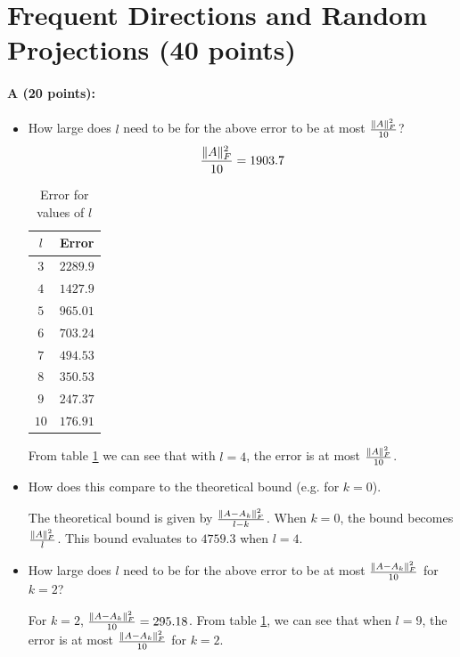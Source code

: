 \documentclass[11pt]{article}
\begin{document}
\section{Frequent Directions and Random Projections (40 points)}

\paragraph{A (20 points):}

\begin{itemize}
\item How large does $l$ need to be for the above error to be at most $\frac{\lVert A\rVert_F^2}{10}$?\\
$$
\frac{\lVert A\rVert_F^2}{10} = 1903.7
$$

\begin{table}[!h] 
    \centering
    \caption{Error for values of $l$}
    \label{ErrL}
    \begin{tabular}{|c|c|}
      \hline
   $l$  & Error  \\
      \hline      
      $3$ &      $2289.9$  \\
      \hline
      $4$ &      $1427.9$  \\
      \hline
      $5$ &      $965.01$  \\
      \hline
      $6$ &      $703.24$  \\
      \hline
      $7$ &      $494.53$  \\
      \hline
      $8$ &      $350.53$  \\
      \hline
      $9$ &      $247.37$  \\
      \hline
      $10$ &      $176.91$  \\
      \hline
    \end{tabular}
\end{table}

From table \ref{ErrL} we can see that with $l=4$, the error is at most $\frac{\lVert A\rVert_F^2}{10}$.

\item How does this compare to the theoretical bound (e.g. for $k = 0$).

The theoretical bound is given by $\frac{\lVert A-A_k\rVert_F^2}{l-k}$. When $k=0$, the bound becomes $\frac{\lVert A\rVert_F^2}{l}$. This bound evaluates to $4759.3$ when $l=4$.

\item How large does $l$ need to be for the above error to be at most $\frac{\lVert A-A_k\rVert_F^2}{10}$ for $k = 2$?

For $k = 2$, $\frac{\lVert A-A_k\rVert_F^2}{10} = 295.18$. From table \ref{ErrL}, we can see that when $l=9$, the error is at most $\frac{\lVert A-A_k\rVert_F^2}{10}$ for $k = 2$.

\end{itemize}
\end{document}
